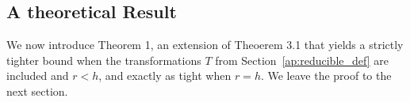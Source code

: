 
\subsection{A theoretical Result}\label{ap:TheoremDef}
We now introduce Theorem 1, an extension of Theoerem 3.1 that yields a strictly tighter bound when the transformations $T$ from Section~\ref{ap:reducible_def} are included and $r < h$, and exactly as tight when $r=h$. We leave the proof to the next section. 


